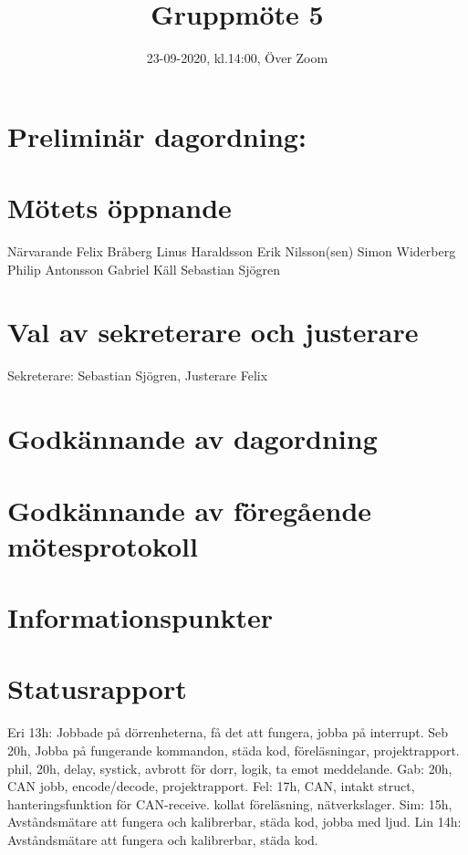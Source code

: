 \documentclass{article}
\title{Gruppmöte 5}
\date{23-09-2020, kl.14:00, Över Zoom}
\begin{document}
 \maketitle
 \section*{Preliminär dagordning:} 

\section{Mötets öppnande} 
Närvarande
Felix Bråberg
Linus Haraldsson
Erik Nilsson(sen)
Simon Widerberg
Philip Antonsson
Gabriel Käll
Sebastian Sjögren

\section{Val av sekreterare och justerare} 

Sekreterare: Sebastian Sjögren, Justerare Felix

\section{Godkännande av dagordning}

\section{Godkännande av föregående mötesprotokoll} 

\section{Informationspunkter} 

\begin{itemize} \end{itemize} 

\section{Statusrapport}

Eri 13h: Jobbade på dörrenheterna, få det att fungera, jobba på interrupt. 
\newline
Seb 20h, Jobba på fungerande kommandon, städa kod, föreläsningar, projektrapport.
\newline
phil, 20h, delay, systick, avbrott för dorr, logik, ta emot meddelande.
\newline
Gab: 20h, CAN jobb, encode/decode, projektrapport.
\newline
Fel: 17h, CAN, intakt struct, hanteringsfunktion för CAN-receive. kollat föreläsning, nätverkslager. 
\newline
Sim: 15h, Avståndsmätare att fungera och kalibrerbar, städa kod, jobba med ljud.
\newline
Lin 14h: Avståndsmätare att fungera och kalibrerbar, städa kod.
\end{document}
